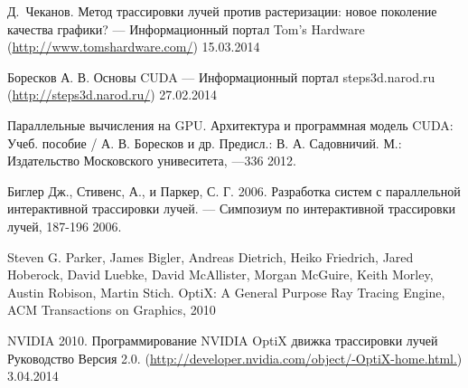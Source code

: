 \newpage
{}
\begin{thebibliography}{0}
Д.~Чеканов. Метод трассировки лучей против растеризации: новое поколение качества графики? ---
 Информационный портал Tom's Hardware (\href{http://www.tomshardware.com/}{http://www.tomshardware.com/}) 15.03.2014

Боресков А. В. Основы CUDA ---  Информационный портал steps3d.narod.ru (\href{http://steps3d.narod.ru/}{http://steps3d.narod.ru/}) 27.02.2014

Параллельные вычисления на GPU. Архитектура и программная модель CUDA: Учеб. пособие / А. В. Боресков и др. Предисл.: В. А. Садовничий. М.: Издательство Московского унивеситета, ---336 2012.

Биглер Дж., Стивенс, А., и Паркер, С. Г. 2006. Разработка систем с параллельной интерактивной трассировки лучей. --- Симпозиум по интерактивной трассировки лучей, 187-196 2006.

Steven G. Parker, James Bigler, Andreas Dietrich, Heiko Friedrich, Jared Hoberock, David Luebke,  David McAllister, Morgan McGuire, Keith Morley, Austin Robison, Martin Stich. OptiX: A General Purpose Ray Tracing Engine, ACM Transactions on Graphics, 2010

NVIDIA 2010. Программирование NVIDIA OptiX движка трассировки лучей 
Руководство Версия 2.0. (\href{http://developer.nvidia.com/object/-OptiX-home.html.}{http://developer.nvidia.com/object/-OptiX-home.html.}) 3.04.2014
\end{thebibliography}
